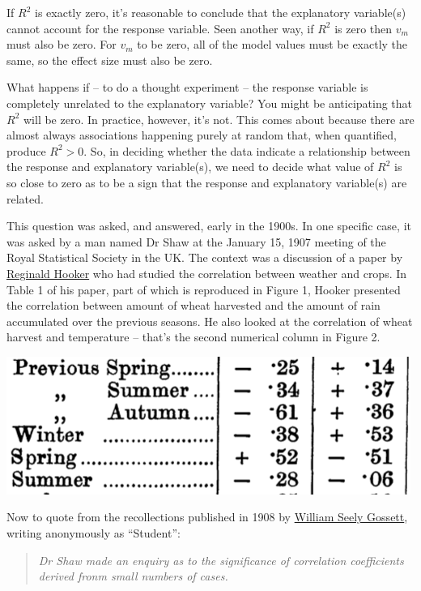 \documentclass[]{book}
\begin{document}
If \(R^2\) is exactly zero, it's reasonable to conclude that the explanatory variable(s) cannot account for the response variable. Seen another way, if \(R^2\) is zero then \(v_m\) must also be zero. For \(v_m\) to be zero, all of the model values must be exactly the same, so the effect size must also be zero.

What happens if -- to do a thought experiment -- the response variable is completely unrelated to the explanatory variable? You might be anticipating that \(R^2\) will be zero. In practice, however, it's not. This comes about because there are almost always associations happening purely at random that, when quantified, produce \(R^2 > 0\). So, in deciding whether the data indicate a relationship between the response and explanatory variable(s), we need to decide what value of \(R^2\) is so close to zero as to be a sign that the response and explanatory variable(s) are related.

This question was asked, and answered, early in the 1900s. In one specific case, it was asked by a man named Dr Shaw at the January 15, 1907 meeting of the Royal Statistical Society in the UK. The context was a discussion of a paper by \href{https://en.wikipedia.org/wiki/Reginald_Hawthorn_Hooker}{Reginald Hooker} who had studied the correlation between weather and crops. In Table 1 of his paper, part of which is reproduced in Figure 1, Hooker presented the correlation between amount of wheat harvested and the amount of rain accumulated over the previous seasons. He also looked at the correlation of wheat harvest and temperature -- that's the second numerical column in Figure 2.

\includegraphics[width=0.8\linewidth]{images/Hooker-correlations}

Now to quote from the recollections published in 1908 by \href{https://en.wikipedia.org/wiki/William_Sealy_Gosset}{William Seely Gossett}, writing anonymously as ``Student'':

\begin{quote}
\emph{Dr Shaw made an enquiry as to the significance of correlation coefficients derived fronm small numbers of cases.}
\end{quote}
\end{document}
